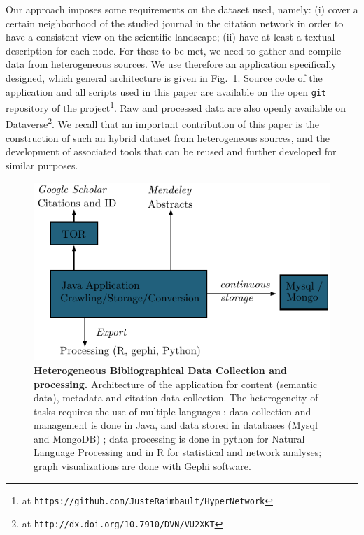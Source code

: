 Our approach imposes some requirements on the dataset used, namely: (i) cover a certain neighborhood of the studied journal in the citation network in order to have a consistent view on the scientific landscape; (ii) have at least a textual description for each node. For these to be met, we need to gather and compile data from heterogeneous sources. We use therefore an application specifically designed, which general architecture is given in Fig.~\ref{fig:datacollection}. Source code of the application and all scripts used in this paper are available on the open \texttt{git} repository of the project\footnote{at \texttt{https://github.com/JusteRaimbault/HyperNetwork}}.  Raw and processed data are also openly available on Dataverse\footnote{at \texttt{http://dx.doi.org/10.7910/DVN/VU2XKT}}. We recall that an important contribution of this paper is the construction of such an hybrid dataset from heterogeneous sources, and the development of associated tools that can be reused and further developed for similar purposes.



\begin{figure}
\includegraphics[width=\textwidth]{figures/Fig1.pdf}
\caption{\textbf{Heterogeneous Bibliographical Data Collection and processing.} Architecture of the application for content (semantic data), metadata and citation data collection. The heterogeneity of tasks requires the use of multiple languages : data collection and management is done in Java, and data stored in databases (Mysql and MongoDB) ; data processing is done in python for Natural Language Processing and in R for statistical and network analyses; graph visualizations are done with Gephi software.}
\label{fig:datacollection}
\end{figure}




